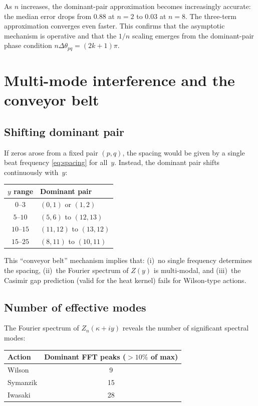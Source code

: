 \documentclass[12pt]{article}
\theoremstyle{definition}
\theoremstyle{remark}
\begin{document}
As $n$ increases, the dominant-pair approximation becomes increasingly
accurate: the median error drops from $0.88$ at $n = 2$ to $0.03$ at
$n = 8$.  The three-term approximation converges even faster.  This
confirms that the asymptotic mechanism is operative and that the
$1/n$ scaling emerges from the dominant-pair phase condition
$n\Delta\theta_{pq} = (2k{+}1)\pi$.


\section{Multi-mode interference and the conveyor belt}
\label{sec:mechanism}

\subsection{Shifting dominant pair}

If zeros arose from a fixed pair $(p, q)$, the spacing would be
given by a single beat frequency \eqref{eq:spacing} for all~$y$.
Instead, the dominant pair shifts continuously with~$y$:
\begin{center}
\begin{tabular}{cl}
\toprule
$y$ range & Dominant pair \\
\midrule
$0$--$3$ & $(0,1)$ or $(1,2)$ \\
$5$--$10$ & $(5,6)$ to $(12,13)$ \\
$10$--$15$ & $(11,12)$ to $(13,12)$ \\
$15$--$25$ & $(8,11)$ to $(10,11)$ \\
\bottomrule
\end{tabular}
\end{center}

This ``conveyor belt'' mechanism implies that:
(i)~no single frequency determines the spacing,
(ii)~the Fourier spectrum of $Z(y)$ is multi-modal, and
(iii)~the Casimir gap prediction (valid for the heat kernel) fails
for Wilson-type actions.

\subsection{Number of effective modes}

The Fourier spectrum of $Z_n(\kappa + iy)$ reveals the number of
significant spectral modes:

\begin{center}
\begin{tabular}{lc}
\toprule
Action & Dominant FFT peaks ($> 10\%$ of max) \\
\midrule
Wilson & 9 \\
Symanzik & 15 \\
Iwasaki & 28 \\
\bottomrule
\end{tabular}
\end{center}
\end{document}
